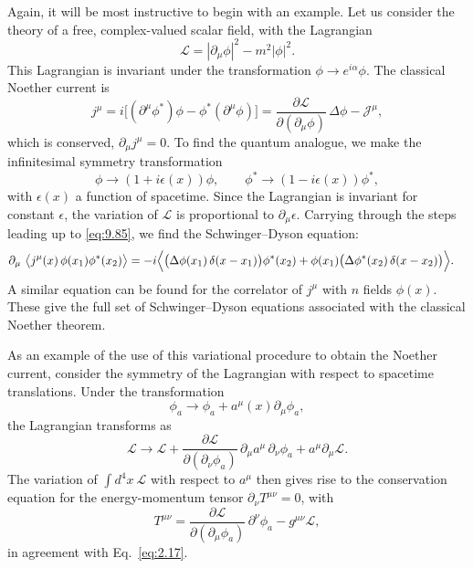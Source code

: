 Again, it will be most instructive to begin with an example.  Let us consider
the theory of a free, complex-valued scalar field, with the Lagrangian
\begin{equation}
  \mathcal{L} = |\partial_\mu\phi|^2 - m^2|\phi|^2 .
  \label{eq:9.90}
\end{equation}
This Lagrangian is invariant under the transformation $\phi\to e^{i\alpha}\phi$.
The classical Noether current is
\begin{equation}
  j^\mu = i\bigl[ (\partial^\mu\phi^{*})\phi - \phi^{*}(\partial^\mu\phi) \bigr]
  = \frac{\partial\mathcal{L}}{\partial(\partial_\mu\phi)}\,\Delta\phi
    - \mathcal{J}^\mu ,
  \label{eq:9.96}
\end{equation}
which is conserved, $\partial_\mu j^\mu = 0$.  To find the quantum analogue,
we make the infinitesimal symmetry transformation
\begin{equation}
  \phi \to (1 + i\epsilon(x))\phi,\qquad
  \phi^{*} \to (1 - i\epsilon(x))\phi^{*},
\end{equation}
with $\epsilon(x)$ a function of spacetime.  Since the Lagrangian is invariant
for constant $\epsilon$, the variation of $\mathcal{L}$ is proportional to
$\partial_\mu\epsilon$.  Carrying through the steps leading up to
\eqref{eq:9.85}, we find the Schwinger--Dyson equation:
\begin{equation}
  \begin{aligned}
    \partial_\mu\ \bigl\langle j^\mu(x)\,\phi(x_1)\phi^{*}(x_2) \bigr\rangle
    &= -i\Bigl\langle \bigl( \Delta\phi(x_1)\,\delta(x-x_1) \bigr)
      \phi^{*}(x_2) + \phi(x_1)\bigl( \Delta\phi^{*}(x_2)\,
        \delta(x-x_2) \bigr) \Bigr\rangle .
  \end{aligned}
  \label{eq:9.98}
\end{equation}
A similar equation can be found for the correlator of $j^\mu$ with $n$ fields
$\phi(x)$.  These give the full set of Schwinger--Dyson equations associated
with the classical Noether theorem.

As an example of the use of this variational procedure to obtain the Noether
current, consider the symmetry of the Lagrangian with respect to spacetime
translations.  Under the transformation
\begin{equation}
  \phi_a \to \phi_a + a^\mu(x)\partial_\mu\phi_a ,
  \label{eq:9.99}
\end{equation}
the Lagrangian transforms as
\begin{equation}
  \mathcal{L} \to \mathcal{L} +
    \frac{\partial\mathcal{L}}{\partial(\partial_\nu\phi_a)}\,
      \partial_\mu a^\mu\,\partial_\nu\phi_a + a^\mu\partial_\mu\mathcal{L} .
\end{equation}
The variation of $\int d^4x\ \mathcal{L}$ with respect to $a^\mu$ then gives
rise to the conservation equation for the energy-momentum tensor
$\partial_\nu T^{\mu\nu} = 0$, with
\begin{equation}
  T^{\mu\nu} = \frac{\partial\mathcal{L}}{\partial(\partial_\mu\phi_a)}\,
    \partial^\nu\phi_a - g^{\mu\nu}\mathcal{L} ,
  \label{eq:9.100}
\end{equation}
in agreement with Eq.~\eqref{eq:2.17}.

